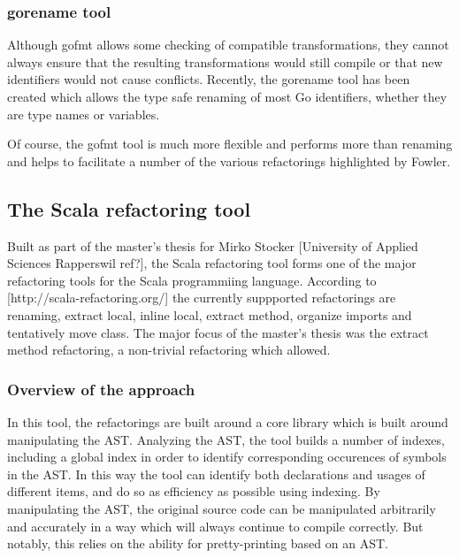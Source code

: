 \subsubsection{gorename tool}
Although gofmt allows some checking of compatible transformations, they cannot always ensure that the resulting transformations would still compile or that new identifiers would not cause conflicts. Recently, the gorename tool has been created which allows the type safe renaming of most Go identifiers, whether they are type names or variables.

Of course, the gofmt tool is much more flexible and performs more than renaming and helps to facilitate a number of the various refactorings highlighted by Fowler.

\subsection{The Scala refactoring tool}
Built as part of the master's thesis for Mirko Stocker [University of Applied Sciences Rapperswil ref?], the Scala refactoring tool forms one of the major refactoring tools for the Scala programmiing language. According to [http://scala-refactoring.org/] the currently suppported refactorings are renaming, extract local, inline local, extract method, organize imports and tentatively move class. The major focus of the master's thesis was the extract method refactoring, a non-trivial refactoring which allowed.

\subsubsection{Overview of the approach}
In this tool, the refactorings are built around a core library which is built around manipulating the AST. Analyzing the AST, the tool builds a number of indexes, including a global index in order to identify corresponding occurences of symbols in the AST. In this way the tool can identify both declarations and usages of different items, and do so as efficiency as possible using indexing. By manipulating the AST, the original source code can be manipulated arbitrarily and accurately in a way which will always continue to compile correctly. But notably, this relies on the ability for pretty-printing based on an AST.

